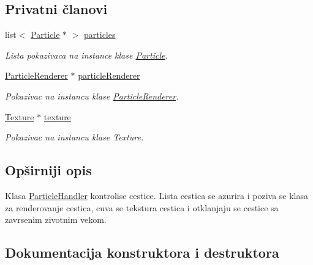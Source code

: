 \subsection*{Privatni članovi}
\begin{DoxyCompactItemize}
\item 
list$<$ \hyperlink{classparticle_1_1Particle}{Particle} $\ast$ $>$ \hyperlink{classparticle_1_1ParticleHandler_abf11adf3a1037f33222ef56e6731cc23}{particles}
\begin{DoxyCompactList}\small\item\em Lista pokazivaca na instance klase \hyperlink{classparticle_1_1Particle}{Particle}. \end{DoxyCompactList}\item 
\hyperlink{classparticle_1_1ParticleRenderer}{Particle\+Renderer} $\ast$ \hyperlink{classparticle_1_1ParticleHandler_a2127e89ae3f9bd53341cd59c286c2a72}{particle\+Renderer}
\begin{DoxyCompactList}\small\item\em Pokazivac na instancu klase \hyperlink{classparticle_1_1ParticleRenderer}{Particle\+Renderer}. \end{DoxyCompactList}\item 
\hyperlink{classtexture_1_1Texture}{Texture} $\ast$ \hyperlink{classparticle_1_1ParticleHandler_a918d1b47f645fc24cc36b1a61d2c20ef}{texture}
\begin{DoxyCompactList}\small\item\em Pokazivac na instancu klase Texture. \end{DoxyCompactList}\end{DoxyCompactItemize}


\subsection{Opširniji opis}
Klasa \hyperlink{classparticle_1_1ParticleHandler}{Particle\+Handler} kontrolise cestice. Lista cestica se azurira i poziva se klasa za renderovanje cestica, cuva se tekstura cestica i otklanjaju se cestice sa zavrsenim zivotnim vekom. 

\subsection{Dokumentacija konstruktora i destruktora}
\mbox{\label{classparticle_1_1ParticleHandler_a20ee0736aeb1a560bd09e83b754aafc1}} 
